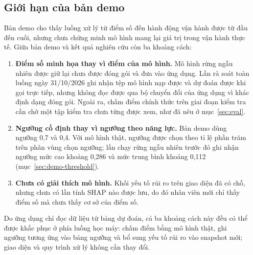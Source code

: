 \FloatBarrier
\subsection{Giới hạn của bản demo}\label{sec:demo-limits}

Bản demo cho thấy luồng xử lý từ điểm số đến hành động vận hành được từ đầu đến cuối, nhưng chưa chứng minh mô hình mang lại giá trị trong vận hành thực tế. Giữa bản demo và kết quả nghiên cứu còn ba khoảng cách:

\begin{enumerate}
  \item \textbf{Điểm số minh họa thay vì điểm của mô hình.} Mô hình rừng ngẫu nhiên được giữ lại chưa được đóng gói và đưa vào ứng dụng. Lần rà soát toàn luồng ngày 31/10/2026 ghi nhận tệp mô hình nạp được và dự đoán được khi gọi trực tiếp, nhưng không đọc được qua bộ chuyển đổi của ứng dụng vì khác định dạng đóng gói. Ngoài ra, chấm điểm chính thức trên giai đoạn kiểm tra cần chờ một tập kiểm tra chưa từng được xem, như đã nêu ở mục~\ref{sec:eval}.
  \item \textbf{Ngưỡng cố định thay vì ngưỡng theo năng lực.} Bản demo dùng ngưỡng 0,7 và 0,4. Với mô hình thật, ngưỡng được chọn theo tỉ lệ phần trăm trên phân vùng chọn ngưỡng; lần chạy rừng ngẫu nhiên trước đó ghi nhận ngưỡng mức cao khoảng 0,286 và mức trung bình khoảng 0,112 (mục~\ref{sec:demo-threshold}).
  \item \textbf{Chưa có giải thích mô hình.} Khối yếu tố rủi ro trên giao diện đã có chỗ, nhưng chưa có lần tính SHAP nào được lưu, do đó nhân viên mới chỉ thấy điểm số mà chưa thấy cơ sở của điểm số.
\end{enumerate}

Do ứng dụng chỉ đọc dữ liệu từ bảng dự đoán, cả ba khoảng cách này đều có thể được khắc phục ở phía luồng học máy: chấm điểm bằng mô hình thật, ghi ngưỡng tương ứng vào bảng ngưỡng và bổ sung yếu tố rủi ro vào snapshot mới; giao diện và quy trình xử lý không cần thay đổi.
